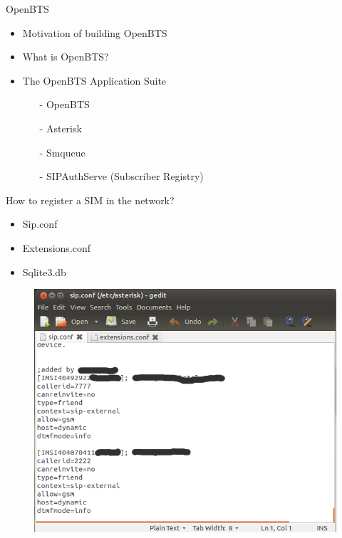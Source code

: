 \documentclass{beamer}
\begin{document}
  \begin{frame}{OpenBTS}
    \begin{itemize}
      \item Motivation of  building OpenBTS
      \item What is OpenBTS?
      \item The OpenBTS Application Suite
        \begin{itemize}
          \item[-] OpenBTS
          \item[-] Asterisk
          \item[-] Smqueue
          \item[-] SIPAuthServe (Subscriber Registry)
        \end{itemize}
    \end{itemize}
  \end{frame}
  

  \begin{frame}{How to register a SIM in the network?}
    \begin{itemize}
      \item Sip.conf
      \item Extensions.conf
      \item Sqlite3.db
    \end{itemize}
    \begin{figure}
      \centering
      \includegraphics[width=0.7\linewidth]{img/sip_conf}
    \end{figure}
  \end{frame}
  
\end{document}
